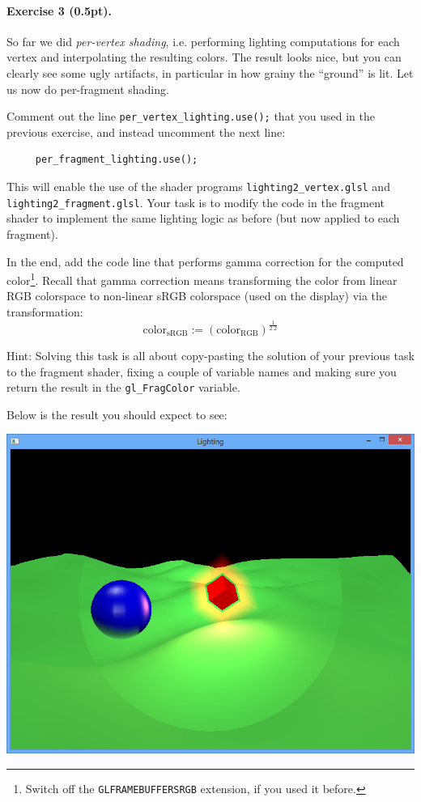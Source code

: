 \documentclass{article}
\newenvironment{exercise}[2]{\paragraph{Exercise #1 (#2pt).} }{
\medskip}
\begin{document}
\begin{exercise}{3}{0.5}
So far we did \emph{per-vertex shading}, i.e. performing lighting computations for each vertex and interpolating the resulting colors. The result looks nice, but you can clearly see some ugly artifacts, in particular in how grainy the ``ground'' is lit. Let us now do per-fragment shading.

\noindent
Comment out the line \verb#per_vertex_lighting.use();# that you used in the previous exercise, and instead uncomment the next line:
\begin{lstlisting}
	 per_fragment_lighting.use();     
\end{lstlisting}
This will enable the use of the shader programs \verb#lighting2_vertex.glsl# and \verb#lighting2_fragment.glsl#. Your task is to modify the code in the fragment shader to implement the same lighting logic as before (but now applied to each fragment). 

In the end, add the code line that performs gamma correction for the computed color\footnote{Switch off the \texttt{GL\textunderscore FRAMEBUFFER\textunderscore SRGB} extension, if you used it before.}. Recall that gamma correction means transforming the color from linear RGB colorspace to non-linear sRGB colorspace (used on the display) via the transformation:
$$
\text{color}_\text{sRGB} := \left(\text{color}_\text{RGB}\right)^\frac{1}{2.2}
$$

Hint: Solving this task is all about copy-pasting the solution of your previous task to the fragment shader, fixing a couple of variable names and making sure you return the result in the \verb#gl_FragColor# variable.
\end{exercise}

Below is the result you should expect to see:
\begin{center}
\includegraphics[width=1.0\textwidth]{lighting2.png}
\end{center}
\end{document}

